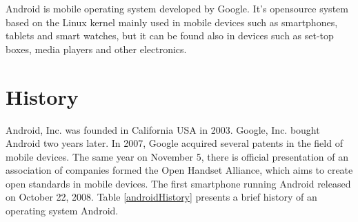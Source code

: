 Android is mobile operating system developed by Google. It's opensource system based on the Linux kernel mainly used in mobile devices such as smartphones, tablets and smart watches, but it can be found also in devices such as set-top boxes, media players and other electronics.

\section{History}
Android, Inc. was founded in California USA in 2003. Google, Inc. bought Android two years later. In 2007, Google acquired several patents in the field of mobile devices. The same year on November 5, there is official presentation of an association of companies formed the Open Handset Alliance, which aims to create open standards in mobile devices. The first smartphone running Android released on October 22, 2008. Table \ref{androidHistory} presents a brief history of an operating system Android. 

